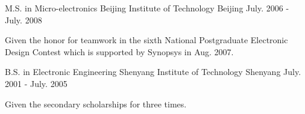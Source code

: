 

\begin{cventries}


\cventry
{M.S. in Micro-electronics} %
{Beijing Institute of Technology} %
{Beijing} %
{July. 2006 - July. 2008} %
{ %
\begin{cvitems}
\item {Given the honor for teamwork in the sixth National Postgraduate Electronic Design Contest which is supported by Synopsys in Aug. 2007.}
\end{cvitems}
}


\cventry
{B.S. in Electronic Engineering} %
{Shenyang Institute of Technology} %
{Shenyang} %
{July. 2001 - July. 2005} %
{ %
\begin{cvitems}
\item {Given the secondary scholarships for three times.}
\end{cvitems}
}

\end{cventries}